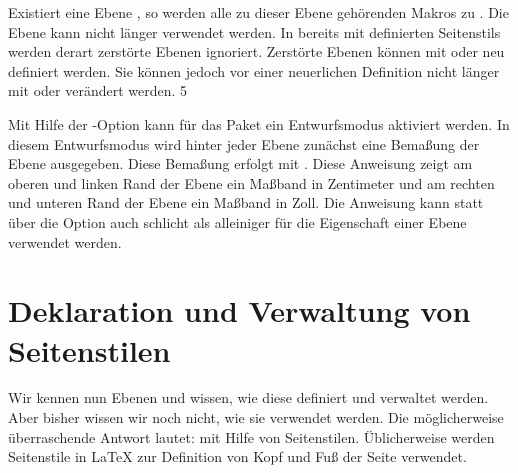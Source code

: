 \begin{Declaration}
\end{Declaration}
Existiert eine Ebene , so werden alle zu dieser Ebene
gehörenden Makros zu . Die Ebene kann nicht länger verwendet
werden. In bereits mit  definierten Seitenstils werden
derart zerstörte Ebenen ignoriert. Zerstörte Ebenen können mit
 oder
 neu definiert werden. Sie können jedoch
vor einer neuerlichen Definition nicht länger mit
 oder
 verändert werden.%
\iffalse %
\par
Die Anweisung ist dazu bestimmt, innerhalb des Arguments \PName{Code} von
\DescRef{\LabelBase.cmd.scrlayerOnAutoRemoveInterface} (siehe
\autoref{sec:scrlayer.enduserinterfaces},
\DescPageRef{scrlayer.cmd.scrlayerOnAutoRemoveInterface}) verwendet zu
werden. Damit können Ebenen, die unter Verwendung von entfernbaren Anweisungen
einer entfernbaren Benutzerschnittstelle definiert wurden, zusammen mit dieser
Benutzerschnittstelle entfernt werden.%
\fi5 \EndIndexGroup


\begin{Declaration}
\end{Declaration}
Mit Hilfe der \KOMAScript-Option
kann für das Paket  ein Entwurfsmodus aktiviert werden. In
diesem Entwurfsmodus wird hinter jeder Ebene zunächst eine Bemaßung der Ebene
ausgegeben. Diese Bemaßung erfolgt mit . Diese
Anweisung zeigt am oberen und linken Rand der Ebene ein Maßband in Zentimeter
und am rechten und unteren Rand der Ebene ein Maßband in Zoll. Die Anweisung
 kann statt über die Option auch schlicht als
alleiniger  für die Eigenschaft  einer Ebene
verwendet werden.%
%
\EndIndexGroup


\section{Deklaration und Verwaltung von Seitenstilen}

\BeginIndexGroup
{}%
Wir kennen nun Ebenen und wissen, wie diese definiert und verwaltet
werden. Aber bisher wissen wir noch nicht, wie sie verwendet werden. Die
möglicherweise überraschende Antwort lautet: mit Hilfe von
Seitenstilen. Üblicherweise werden Seitenstile in \LaTeX{} zur Definition von
Kopf und Fuß der Seite verwendet.


